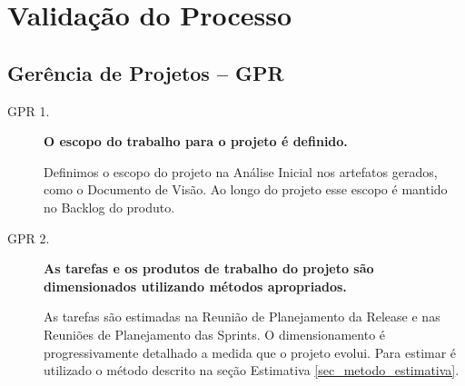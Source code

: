 \chapter{Validação do Processo}
\label{anexo_validacao}



\section{Gerência de Projetos – GPR}

\begin{description}

	\item[GPR 1.] \textbf{O escopo do trabalho para o projeto é definido.}

	Definimos o escopo do projeto na Análise Inicial nos artefatos gerados, como o Documento de Visão. Ao longo do projeto esse escopo é mantido no Backlog do produto.

	\item[GPR 2.] \textbf{As tarefas e os produtos de trabalho do projeto são dimensionados utilizando métodos apropriados.}

	As tarefas são estimadas na Reunião de Planejamento da Release e nas Reuniões de Planejamento das Sprints. O dimensionamento é progressivamente detalhado a medida que o projeto evolui. Para estimar é utilizado o método descrito na seção Estimativa \ref{sec_metodo_estimativa}.


\end{description}




